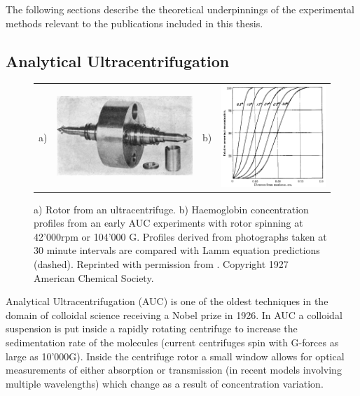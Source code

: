 \documentclass{doctoral}
\begin{document}
The following sections describe the theoretical underpinnings of the experimental methods relevant to the publications included in this thesis.

\subsection{Analytical Ultracentrifugation}
\label{sec:AUC}

\begin{figure}[h]
    \centering
    \begin{tabular}{llll}
        a)                                                                                      &
        \includegraphics[height=0.3\linewidth,valign=t]{figures/ultracentrifugation_device.png} &
        b)                                                                                      &
        \includegraphics[height=0.3\linewidth,valign=t]{figures/ultracentrifugation_results.png}
    \end{tabular}

    \caption{a) Rotor from an ultracentrifuge. b) Haemoglobin concentration profiles from an early AUC experiments with rotor spinning at 42'000rpm or 104'000 G.
        Profiles derived from photographs taken at 30 minute intervals are compared with Lamm equation predictions (dashed).
        Reprinted with permission from \cite{Svedberg_1927}.
        Copyright 1927 American Chemical Society.
    }
    \label{fig:auc_diagram}
\end{figure}

Analytical Ultracentrifugation (AUC) is one of the oldest techniques in the domain of colloidal science receiving a Nobel prize in 1926.
In AUC a colloidal suspension is put inside a rapidly rotating centrifuge to increase the sedimentation rate of the molecules (current centrifuges spin with G-forces as large as 10'000G).
Inside the centrifuge rotor a small window allows for optical measurements of either absorption or transmission (in recent models involving multiple wavelengths) which change as a result of concentration variation.
\end{document}
